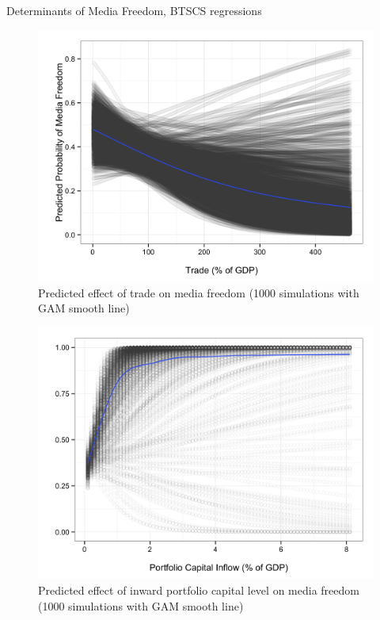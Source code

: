\documentclass[12pt]{report}
\begin{document}
\begin{centering}

\pagebreak{}
\begin{table}

\caption{Determinants of Media Freedom, BTSCS regressions}
\end{table}

\pagebreak{}
\begin{figure}
\includegraphics[scale=0.2]{article2_trade_effect_plot.png}
\caption{Predicted effect of trade on media freedom (1000 simulations with
GAM smooth line)}
\end{figure}

\pagebreak{}
\begin{figure}
\includegraphics[scale=0.2]{article2_portfolio_effect_plot.png}
\caption{Predicted effect of inward portfolio capital level on media freedom
(1000 simulations with GAM smooth line)}
\end{figure}


\end{centering}
\end{document}
